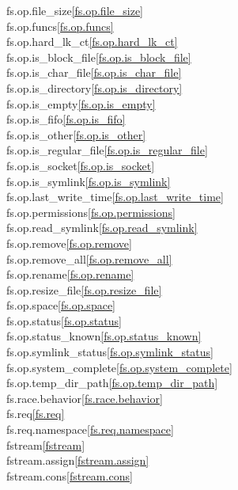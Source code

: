\begin{multicols}{2}
fs.op.file_size\quad\ref{fs.op.file_size}\\
fs.op.funcs\quad\ref{fs.op.funcs}\\
fs.op.hard_lk_ct\quad\ref{fs.op.hard_lk_ct}\\
fs.op.is_block_file\quad\ref{fs.op.is_block_file}\\
fs.op.is_char_file\quad\ref{fs.op.is_char_file}\\
fs.op.is_directory\quad\ref{fs.op.is_directory}\\
fs.op.is_empty\quad\ref{fs.op.is_empty}\\
fs.op.is_fifo\quad\ref{fs.op.is_fifo}\\
fs.op.is_other\quad\ref{fs.op.is_other}\\
fs.op.is_regular_file\quad\ref{fs.op.is_regular_file}\\
fs.op.is_socket\quad\ref{fs.op.is_socket}\\
fs.op.is_symlink\quad\ref{fs.op.is_symlink}\\
fs.op.last_write_time\quad\ref{fs.op.last_write_time}\\
fs.op.permissions\quad\ref{fs.op.permissions}\\
fs.op.read_symlink\quad\ref{fs.op.read_symlink}\\
fs.op.remove\quad\ref{fs.op.remove}\\
fs.op.remove_all\quad\ref{fs.op.remove_all}\\
fs.op.rename\quad\ref{fs.op.rename}\\
fs.op.resize_file\quad\ref{fs.op.resize_file}\\
fs.op.space\quad\ref{fs.op.space}\\
fs.op.status\quad\ref{fs.op.status}\\
fs.op.status_known\quad\ref{fs.op.status_known}\\
fs.op.symlink_status\quad\ref{fs.op.symlink_status}\\
fs.op.system_complete\quad\ref{fs.op.system_complete}\\
fs.op.temp_dir_path\quad\ref{fs.op.temp_dir_path}\\
fs.race.behavior\quad\ref{fs.race.behavior}\\
fs.req\quad\ref{fs.req}\\
fs.req.namespace\quad\ref{fs.req.namespace}\\
fstream\quad\ref{fstream}\\
fstream.assign\quad\ref{fstream.assign}\\
fstream.cons\quad\ref{fstream.cons}\\

\end{multicols}
